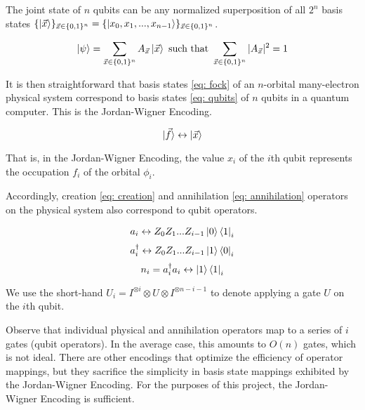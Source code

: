 The joint state of $n$ qubits can be any normalized superposition of all $2^n$ basis states $\{\ket{\vec{x}}\}_{\vec{x} \in \{0, 1\}^n} = \{\ket{x_0, x_1, ..., x_{n - 1}}\}_{\vec{x} \in \{0, 1\}^n}$.

\begin{equation}
    \ket{\psi} = \sum_{\vec{x} \in \{0, 1\}^n} A_{\vec{x}} \ket{\vec{x}} \text{ such that } \sum_{\vec{x} \in \{0, 1\}^n} |A_{\vec{x}}|^2 = 1 \label{eq: qubits}
\end{equation}

It is then straightforward that basis states \eqref{eq: fock} of an $n$-orbital many-electron physical system correspond to basis states \eqref{eq: qubits} of $n$ qubits in a quantum computer. This is the Jordan-Wigner Encoding.

\begin{equation}
    \ket{\vec{f}} \leftrightarrow \ket{\vec{x}}
\end{equation}

That is, in the Jordan-Wigner Encoding, the value $x_i$ of the $i$th qubit represents the occupation $f_i$ of the orbital $\phi_i$.

Accordingly, creation \eqref{eq: creation} and annihilation \eqref{eq: annihilation} operators on the physical system also correspond to qubit operators.

\begin{equation}
    a_i \leftrightarrow Z_0Z_1...Z_{i - 1}\ket{0}\bra{1}_i \label{eq: JWdown}
\end{equation}
\begin{equation}
    a^\dag_i \leftrightarrow Z_0Z_1...Z_{i - 1}\ket{1}\bra{0}_i \label{eq: JWup}
\end{equation}
\begin{equation}
    n_i = a^\dag_ia_i \leftrightarrow \ket{1}\bra{1}_i \label{eq: JWnum}
\end{equation}

We use the short-hand $U_i = I^{\otimes i}\otimes U \otimes I^{\otimes n - i - 1}$ to denote applying a gate $U$ on the $i$th qubit.

Observe that individual physical and annihilation operators map to a series of $i$ gates (qubit operators). In the average case, this amounts to $O(n)$ gates, which is not ideal. There are other encodings that optimize the efficiency of operator mappings, but they sacrifice the simplicity in basis state mappings exhibited by the Jordan-Wigner Encoding. For the purposes of this project, the Jordan-Wigner Encoding is sufficient.

